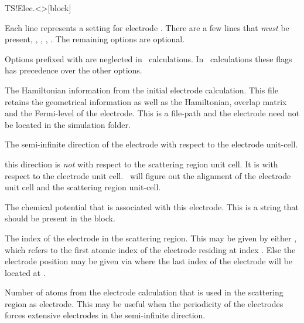 \begin{fdfentry}{TS!Elec.<>}[block]

  Each line represents a setting for electrode \fdf*{<>}.
  There are a few lines that \emph{must} be present, ,
  , , . The
  remaining options are optional.

  \note Options prefixed with  are neglected in \tsiesta\
  calculations. In \tbtrans\ calculations these flags has precedence
  over the other options.

  \begin{fdfoptions}

    \option[HS]%
    The Hamiltonian information from the initial electrode
    calculation. This file retains the geometrical information as well
    as the Hamiltonian, overlap matrix and the Fermi-level of the
    electrode. 
    This is a file-path and the electrode  need not be
    located in the simulation folder.

    The semi-infinite direction of the electrode with respect to the
    electrode unit-cell. 

    \note this direction is \emph{not} with respect to the scattering
    region unit cell. It is with respect to the electrode unit
    cell. \tsiesta\ will figure out the alignment of the electrode
    unit cell and the scattering region unit-cell.

    The chemical potential that is associated with this
    electrode. This is a string that should be present in the
     block.

    The index of the electrode in the scattering region.
    This may be given by either , which refers to
    the first atomic index of the electrode residing at index
    . Else the electrode position may be given via
     where the last index of the electrode
    will be located at \fdf*{<idx>}.

    Number of atoms from the electrode calculation that is used in the
    scattering region as electrode. This may be useful when the
    periodicity of the electrodes forces extensive electrodes in the
    semi-infinite direction.


\end{fdfoptions}
\end{fdfentry}
